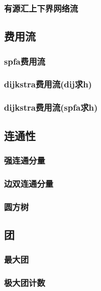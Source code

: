 ﻿\documentclass[a4paper,twocolumn]{article}
\begin{document}
\subsubsection{有源汇上下界网络流}

\subsection{费用流}
\subsubsection{spfa费用流}

\subsubsection{dijkstra费用流(dij求h)}

\subsubsection{dijkstra费用流(spfa求h)}

\subsection{连通性}
\subsubsection{强连通分量}

\subsubsection{边双连通分量}

\subsubsection{圆方树}

\subsection{团}
\subsubsection{最大团}

\subsubsection{极大团计数}

\end{document}
